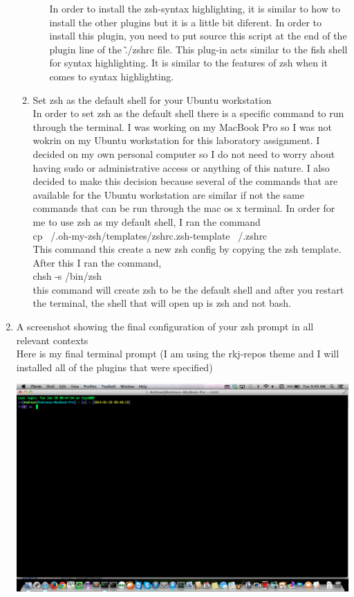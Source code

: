 \documentclass{article}
\begin{document}
\begin{enumerate}
\begin{enumerate}
\begin{enumerate}
In order to install the zsh-syntax highlighting, it is similar to how to install the other plugins but it is a little bit diferent. In order to install this plugin, you need to put source this script at the end of the plugin line of the \~./zshrc file. This plug-in acts similar to the fish shell for syntax highlighting. It is similar to the features of zsh when it comes to syntax highlighting.
\end{enumerate}
\item Set zsh as the default shell for your Ubuntu workstation
\\
In order to set zsh as the default shell there is a specific command to run through the terminal. I was working on my MacBook Pro so I was not wokrin on my Ubuntu workstation for this laboratory assignment. I decided on my own personal computer so I do not need to worry about having sudo or administrative access or anything of this nature. I also decided to make this decision because several of the commands that are available for the Ubuntu workstation are similar if not the same commands that can be run through the mac os x terminal. In order for me to use zsh as my default shell, I ran the command 
\\
cp ~/.oh-my-zsh/templates/zshrc.zsh-template ~/.zshrc
\\
This command this create a new zsh config by copying the zsh template. After this I ran the command,
\\
chsh -s /bin/zsh
\\
this command will create zsh to be the default shell and after you restart the terminal, the shell that will open up is zsh and not bash.
\end{enumerate}
\item A screenshot showing the final configuration of your zsh prompt in all relevant contexts
\\
Here is my final terminal prompt (I am using the rkj-repos theme and I will installed all of the plugins that were specified)
\begin{center}
\includegraphics[width=5in]{images/zsh.png}

\end{center}
\end{enumerate}
\end{document}
